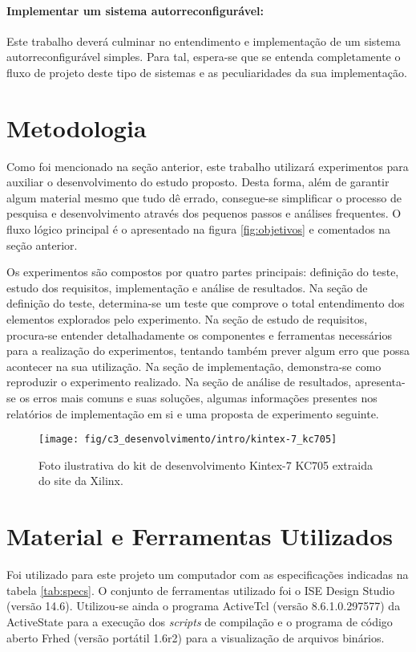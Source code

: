 \documentclass[11pt,a4paper,oneside]{book}
\begin{document}
\paragraph{Implementar um sistema autorreconfigurável:} Este trabalho deverá culminar no entendimento e implementação de um sistema autorreconfigurável simples. Para tal, espera-se que se entenda completamente o fluxo de projeto deste tipo de sistemas e as peculiaridades da sua implementação.

\section{Metodologia}
Como foi mencionado na seção anterior, este trabalho utilizará experimentos para auxiliar o desenvolvimento do estudo proposto.
Desta forma, além de garantir algum material mesmo que tudo dê errado, consegue-se simplificar o processo de pesquisa e desenvolvimento através dos pequenos passos e análises frequentes.
O fluxo lógico principal é o apresentado na figura \ref{fig:objetivos} e comentados na seção anterior.

Os experimentos são compostos por quatro partes principais: definição do teste, estudo dos requisitos, implementação e análise de resultados.
Na seção de definição do teste, determina-se um teste que comprove o total entendimento dos elementos explorados pelo experimento.
Na seção de estudo de requisitos, procura-se entender detalhadamente os componentes e ferramentas necessários para a realização do experimentos, tentando também prever algum erro que possa acontecer na sua utilização.
Na seção de implementação, demonstra-se como reproduzir o experimento realizado.
Na seção de análise de resultados, apresenta-se os erros mais comuns e suas soluções, algumas informações presentes nos relatórios de implementação em si e uma proposta de experimento seguinte.

\begin{figure}[h]
\centering
\texttt{[image: fig/c3\_desenvolvimento/intro/kintex-7\_kc705]}
\caption{Foto ilustrativa do kit de desenvolvimento Kintex-7 KC705 extraida do site da Xilinx.}
\label{fig:kc705}
\end{figure} 

\section{Material e Ferramentas Utilizados}
Foi utilizado para este projeto um computador com as especificações indicadas na tabela \ref{tab:specs}.
O conjunto de ferramentas utilizado foi o ISE Design Studio (versão 14.6).
Utilizou-se ainda o programa ActiveTcl (versão 8.6.1.0.297577) da ActiveState para a execução dos \textit{scripts} de compilação e o programa de código aberto Frhed (versão portátil 1.6r2) para a visualização de arquivos binários.
\end{document}
